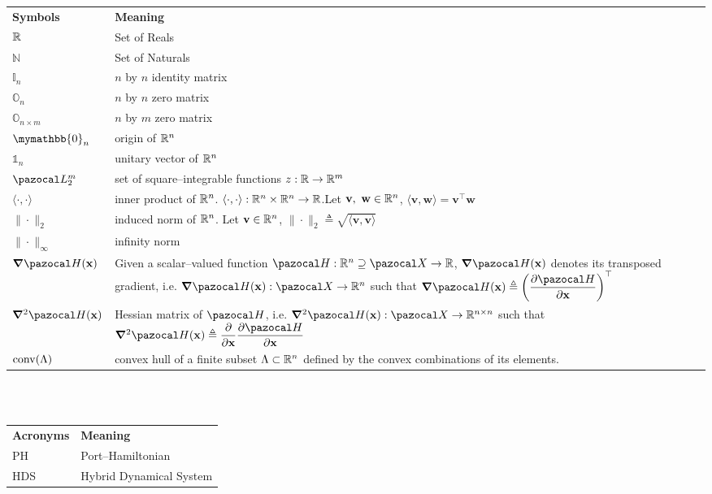 \mbox{}\\
\mbox{}\\
\begin{tabularx}{0.95\textwidth}{p{2.75cm} X}
\textbf{Symbols} 			& \textbf{Meaning}\\
 $\mathbb{R}$                       & Set of Reals\\
 $\mathbb{N}$               & Set of Naturals\\
 $\mathbb{I}_n$             & $n$ by $n$ identity matrix\\
 $\mathbb{O}_n$             & $n$ by $n$ zero matrix\\
 $\mathbb{O}_{n\times m}$   & $n$ by $m$ zero matrix\\
 $\mymathbb{0}_n$           & origin of $\mathbb{R}^n$\\
 $\mathbb{1}_n$             & unitary vector of $\mathbb{R}^n$\\
 $\La_2^m$                  & set of square--integrable functions $z:\mathbb{R}\rightarrow\mathbb{R}^m$\\
 $\langle \cdot,\cdot\rangle$ & {inner product of $\mathbb{R}^n$. $\langle \cdot,\cdot\rangle:\mathbb{R}^n\times\mathbb{R}^n\rightarrow\mathbb{R}$.\newline Let $\mathbf{v},~\mathbf{w}\in\mathbb{R}^n$, $\langle \mathbf{v},\mathbf{w}\rangle = \mathbf{v}^\top \mathbf{w}$} \\
 $\|\cdot\|_2$              & induced norm of $\mathbb{R}^n$. Let $\mathbf{v}\in\mathbb{R}^n$, $\|\cdot\|_2\triangleq\sqrt{\langle \mathbf{v},\mathbf{v}\rangle}$ \\
 $\|\cdot\|_\infty$         & infinity norm\\
 $\bm\nabla\Ha(\xb)$        & Given a scalar--valued function $\Ha:\R^n\supseteq\X\rightarrow\R$, $\bm\nabla\Ha(\xb)$ denotes its transposed gradient, i.e. $\bm\nabla\Ha(\xb):\X\rightarrow\R^n$ such that $\bm\nabla\Ha(\xb)\triangleq\left(\dfrac{\partial \Ha}{\partial\xb}\right)^\top$\\
 $\bm\nabla^2\Ha(\xb)$      & Hessian matrix of $\Ha$, i.e. $\bm\nabla^2\Ha(\xb):\X\rightarrow\R^{n\times n}$ such that $\bm\nabla^2\Ha(\xb)\triangleq\dfrac{\partial}{\partial\xb}\dfrac{\partial\Ha}{\partial\x}$\\
 $\operatorname{conv}(\Lambda)$           & convex hull of a finite subset $\Lambda\subset\mathbb{R}^n$ defined by the convex combinations of its elements. 
\end{tabularx}

\mbox{}\\
\mbox{}\\
\begin{tabularx}{0.95\textwidth}{p{2.75cm} X}
 \textbf{Acronyms} 			& \textbf{Meaning}\\
PH				    & Port--Hamiltonian\\
HDS					& Hybrid Dynamical System\\
\end{tabularx}
